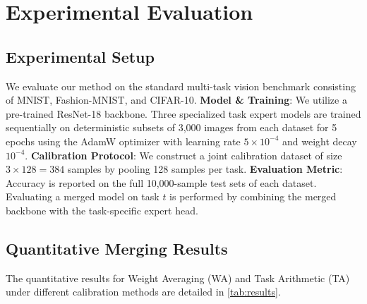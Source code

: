 \documentclass{article}
\theoremstyle{plain}
\theoremstyle{definition}
\theoremstyle{remark}
\begin{document}
\section{Experimental Evaluation}
\label{sec:experiments}

\subsection{Experimental Setup}
We evaluate our method on the standard multi-task vision benchmark consisting of MNIST, Fashion-MNIST, and CIFAR-10.
\textbf{Model \& Training}: We utilize a pre-trained ResNet-18 backbone. Three specialized task expert models are trained sequentially on deterministic subsets of 3,000 images from each dataset for 5 epochs using the AdamW optimizer with learning rate $5 \times 10^{-4}$ and weight decay $10^{-4}$.
\textbf{Calibration Protocol}: We construct a joint calibration dataset of size $3 \times 128 = 384$ samples by pooling 128 samples per task.
\textbf{Evaluation Metric}: Accuracy is reported on the full 10,000-sample test sets of each dataset. Evaluating a merged model on task $t$ is performed by combining the merged backbone with the task-specific expert head.

\subsection{Quantitative Merging Results}
The quantitative results for Weight Averaging (WA) and Task Arithmetic (TA) under different calibration methods are detailed in \cref{tab:results}.
\end{document}
